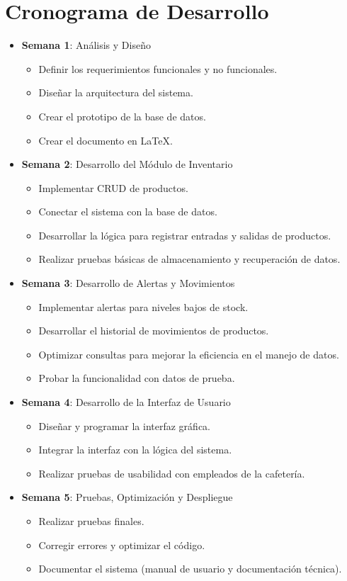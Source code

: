 \documentclass{article}
\begin{document}
\section{Cronograma de Desarrollo}
\begin{itemize}
\item \textbf{Semana 1}: Análisis y Diseño
\begin{itemize}
\item Definir los requerimientos funcionales y no funcionales.
\item Diseñar la arquitectura del sistema.
\item Crear el prototipo de la base de datos.
\item Crear el documento en \LaTeX.
\end{itemize}
\item \textbf{Semana 2}: Desarrollo del Módulo de Inventario
\begin{itemize}
\item Implementar CRUD de productos.
\item Conectar el sistema con la base de datos.
\item Desarrollar la lógica para registrar entradas y salidas de productos.
\item Realizar pruebas básicas de almacenamiento y recuperación de datos.
\end{itemize}
\item \textbf{Semana 3}: Desarrollo de Alertas y Movimientos
\begin{itemize}
\item Implementar alertas para niveles bajos de stock.
\item Desarrollar el historial de movimientos de productos.
\item Optimizar consultas para mejorar la eficiencia en el manejo de datos.
\item Probar la funcionalidad con datos de prueba.
\end{itemize}
\item \textbf{Semana 4}: Desarrollo de la Interfaz de Usuario
\begin{itemize}
\item Diseñar y programar la interfaz gráfica.
\item Integrar la interfaz con la lógica del sistema.
\item Realizar pruebas de usabilidad con empleados de la cafetería.
\end{itemize}
\item \textbf{Semana 5}: Pruebas, Optimización y Despliegue
\begin{itemize}
\item Realizar pruebas finales.
\item Corregir errores y optimizar el código.
\item Documentar el sistema (manual de usuario y documentación técnica).
\end{itemize}
\end{itemize}
\end{document}
